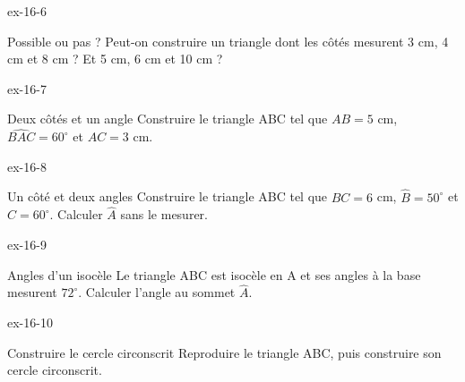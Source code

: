 \begin{blocLivre}{ex-16-6}\begin{exercice}[2]{Possible ou pas ?}
Peut-on construire un triangle dont les côtés mesurent 3 cm, 4 cm et 8 cm ? Et 5 cm, 6 cm et 10 cm ?
\label{fig-ex-16-6}
\end{exercice}\end{blocLivre}
\begin{blocLivre}{ex-16-7}\begin{exercice}[2]{Deux côtés et un angle}
Construire le triangle ABC tel que $AB=5$ cm, $\widehat{BAC}=60^\circ$ et $AC=3$ cm.
\label{fig-ex-16-7}
\end{exercice}\end{blocLivre}
\begin{blocLivre}{ex-16-8}\begin{exercice}[2]{Un côté et deux angles}
Construire le triangle ABC tel que $BC=6$ cm, $\widehat{B}=50^\circ$ et $\widehat{C}=60^\circ$. Calculer $\widehat{A}$ sans le mesurer.
\label{fig-ex-16-8}
\end{exercice}\end{blocLivre}
\begin{blocLivre}{ex-16-9}\begin{exercice}[2]{Angles d’un isocèle}
Le triangle ABC est isocèle en A et ses angles à la base mesurent $72^\circ$. Calculer l’angle au sommet $\widehat{A}$.
\label{fig-ex-16-9}
\end{exercice}\end{blocLivre}
\begin{blocLivre}{ex-16-10}\begin{exercice}[2]{Construire le cercle circonscrit}
Reproduire le triangle ABC, puis construire son cercle circonscrit.
\label{fig-ex-16-10}
\end{exercice}\end{blocLivre}

